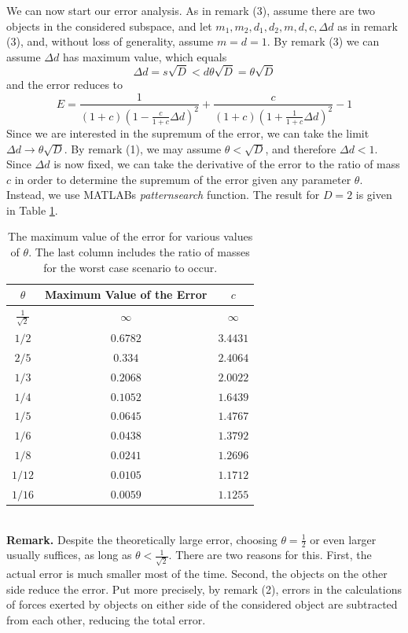 We can now start our error analysis.
As in remark (3), assume there are two objects in the considered subspace, and let $m_1,m_2,d_1,d_2,m,d,c,\Delta d$ as in remark (3), and, without loss of generality, assume $m = d = 1$. By remark (3) we can assume $\Delta d$ has maximum value, which equals
\[
\Delta d = s\sqrt{D} < d\theta \sqrt{D} = \theta\sqrt{D}
\]
and the error reduces to
\[
E = \frac{1}{(1+c)(1-\frac{c}{1+c}\Delta d)^2}+\frac{c}{(1+c)(1+\frac{1}{1+c}\Delta d)^2}-1
\]
Since we are interested in the supremum of the error, we can take the limit $\Delta d \rightarrow \theta \sqrt{D}$. By remark (1), we may assume $\theta < \sqrt{D}$, and therefore $\Delta d<1$.\\
Since $\Delta d$ is now fixed, we can take the derivative of the error to the ratio of mass $c$ in order to determine the supremum of the error given any parameter $\theta$. Instead, we use MATLABs \textit{patternsearch} function. The result for $D=2$ is given in Table \ref{tab:maxerror}.
\begin{table}[h!]
\centering
\caption{The maximum value of the error for various values of $\theta$. The last column includes the ratio of masses for the worst case scenario to occur.}
\label{tab:maxerror}
\begin{tabular}{c|c|c}
$\theta$ & Maximum Value of the Error & $c$\\
\hline
$\frac{1}{\sqrt{2}}$ & $\infty$ & $\infty$\\
$1/2$ & $0.6782$ & $3.4431$\\
$2/5$ & $0.334$ & $2.4064$\\
$1/3$ & $0.2068$ & $2.0022$\\
$1/4$ & $0.1052$ & $1.6439$\\
$1/5$ & $0.0645$ & $1.4767$\\
$1/6$ & $0.0438$ & $1.3792$\\
$1/8$ & $0.0241$ & $1.2696$\\
$1/12$ & $0.0105$ & $1.1712$\\
$1/16$ & $0.0059$ & $1.1255$ 
\end{tabular}
\end{table}\\
\textbf{Remark.} Despite the theoretically large error, choosing $\theta = \frac{1}{2}$ or even larger usually suffices, as long as $\theta < \frac{1}{\sqrt{2}}$. There are two reasons for this. First, the actual error is much smaller most of the time. Second, the objects on the other side reduce the error. Put more precisely, by remark (2), errors in the calculations of forces exerted by objects on either side of the considered object are subtracted from each other, reducing the total error.
